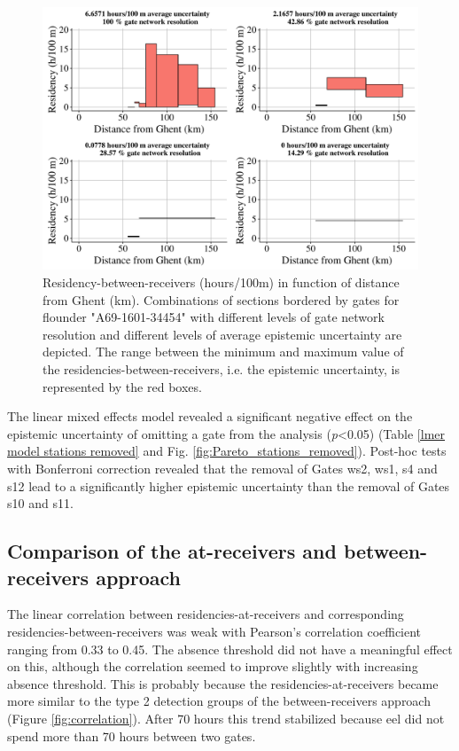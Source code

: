 \documentclass[preprint,12pt,authoryear]{elsarticle}
\begin{document}
\begin{spacing}{1.9}
\begin{figure}[h!]
  \centering\includegraphics[scale=0.45]{flounder_res_model_jb.pdf}
  \caption{Residency-between-receivers (hours/100m) in function of distance from Ghent (km). Combinations of sections bordered by gates for flounder "A69-1601-34454" with different levels of gate network resolution and different levels of average epistemic uncertainty are depicted. The range between the minimum and maximum value of the residencies-between-receivers, i.e. the epistemic uncertainty, is represented by the red boxes.}
  \label{fig:Resistance_model_flounder}
\end{figure}

The linear mixed effects model revealed a significant negative effect on the epistemic uncertainty of omitting a gate from the analysis (\textit{p}<0.05) (Table \ref{lmer model stations removed} and Fig. \ref{fig:Pareto_stations_removed}). Post-hoc tests with Bonferroni correction revealed that the removal of Gates ws2, ws1, s4 and s12 lead to a significantly higher epistemic uncertainty than the removal of Gates s10 and s11. 

\subsection{Comparison of the at-receivers and between-receivers approach}

The linear correlation between residencies-at-receivers and corresponding residencies-between-receivers was weak with Pearson's correlation coefficient ranging from 0.33 to 0.45. The absence threshold did not have a meaningful effect on this, although the correlation seemed to improve slightly with increasing absence threshold. This is probably because the residencies-at-receivers became more similar to the type 2 detection groups of the between-receivers approach (Figure \ref{fig:correlation}). After 70 hours this trend stabilized because eel did not spend more than 70 hours between two gates. 


\end{spacing}
\end{document}
